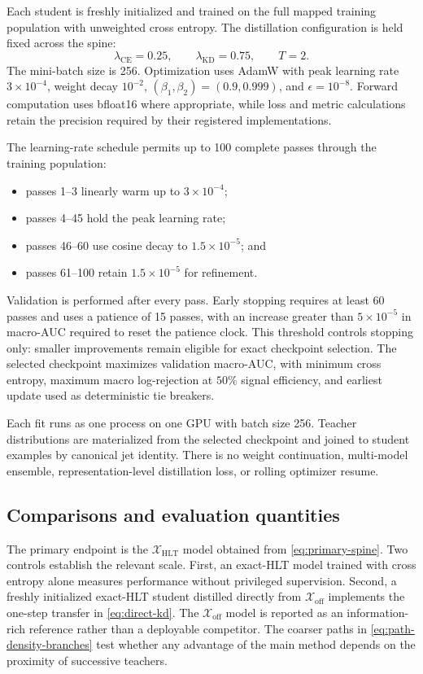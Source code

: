 \documentclass[11pt]{article}
\newcommand{\xoff}{\mathcal{X}_{\mathrm{off}}}
\newcommand{\xhlt}{\mathcal{X}_{\mathrm{HLT}}}
\begin{document}
Each student is freshly initialized and trained on the full mapped training
population with unweighted cross entropy.  The distillation configuration is
held fixed across the spine:
\begin{equation}
    \lambda_{\mathrm{CE}}=0.25,
    \qquad
    \lambda_{\mathrm{KD}}=0.75,
    \qquad
    T=2.
    \label{eq:registered-loss}
\end{equation}
The mini-batch size is 256.  Optimization uses AdamW with peak learning
rate $3\times10^{-4}$, weight decay $10^{-2}$, $(\beta_1,\beta_2)=(0.9,0.999)$,
and $\epsilon=10^{-8}$.  Forward computation uses bfloat16 where appropriate,
while loss and metric calculations retain the precision required by their
registered implementations.

The learning-rate schedule permits up to 100 complete passes through the
training population:
\begin{itemize}
    \item passes 1--3 linearly warm up to $3\times10^{-4}$;
    \item passes 4--45 hold the peak learning rate;
    \item passes 46--60 use cosine decay to $1.5\times10^{-5}$; and
    \item passes 61--100 retain $1.5\times10^{-5}$ for refinement.
\end{itemize}
Validation is performed after every pass.  Early stopping requires at least
60 passes and uses a patience of 15 passes, with an increase greater than
$5\times10^{-5}$ in macro-AUC required to reset the patience clock.  This
threshold controls stopping only: smaller improvements remain eligible for
exact checkpoint selection.  The selected checkpoint maximizes validation
macro-AUC, with minimum cross entropy, maximum macro log-rejection at $50\%$
signal efficiency, and earliest update used as deterministic tie breakers.

Each fit runs as one process on one GPU with batch size 256.  Teacher
distributions are materialized from the selected checkpoint and joined to
student examples by canonical jet identity.  There is no weight continuation,
multi-model ensemble, representation-level distillation loss, or rolling
optimizer resume.

\subsection{Comparisons and evaluation quantities}

The primary endpoint is the $\xhlt$ model obtained from
\cref{eq:primary-spine}.  Two controls establish the relevant scale.  First,
an exact-HLT model trained with cross entropy alone measures performance
without privileged supervision.  Second, a freshly initialized exact-HLT
student distilled directly from $\xoff$ implements the one-step transfer in
\cref{eq:direct-kd}.  The $\xoff$ model is reported as an information-rich
reference rather than a deployable competitor.  The coarser paths in
\cref{eq:path-density-branches} test whether any advantage of the main method
depends on the proximity of successive teachers.
\end{document}
